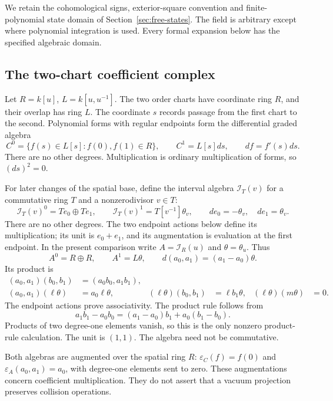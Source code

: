 We retain the cohomological signs, exterior-square convention and
finite-polynomial state domain of Section~\ref{sec:free-states}.
The field is arbitrary except where polynomial integration is used.
Every formal expansion below has the specified algebraic domain.

\subsection{The two-chart coefficient complex}
\label{sb:sec:two-chart}

Let \(R=k[u]\), \(L=k[u,u^{-1}]\).  The two order charts have
coordinate ring \(R\), and their overlap has ring \(L\).
The coordinate \(s\) records passage from the first chart to the second.
Polynomial forms with regular endpoints form the differential graded algebra
\[
 C^0=\{f(s)\in L[s]:f(0),f(1)\in R\},\qquad
 C^1=L[s]ds,\qquad df=f'(s)ds.
\]
There are no other degrees.  Multiplication is ordinary multiplication
of forms, so \((ds)^2=0\).

For later changes of the spatial base, define the interval algebra
\(\mathcal I_T(v)\) for a commutative ring \(T\) and a
nonzerodivisor \(v\in T\):
\begin{equation}\label{sb:eq:general-interval}
 \mathcal I_T(v)^0=Te_0\oplus Te_1,\qquad
 \mathcal I_T(v)^1=T[v^{-1}]\theta_v,\qquad
 de_0=-\theta_v,\quad de_1=\theta_v.
\end{equation}
There are no other degrees.  The two endpoint actions below define
its multiplication; its unit is \(e_0+e_1\), and its augmentation
is evaluation at the first endpoint.  In the present comparison write
\(A=\mathcal I_R(u)\) and \(\theta=\theta_u\).  Thus
\begin{equation}\label{sb:eq:two-chart}
 A^0=R\oplus R,\qquad A^1=L\theta,\qquad
 d(a_0,a_1)=(a_1-a_0)\theta.
\end{equation}
Its product is
\[
 \begin{aligned}
 (a_0,a_1)(b_0,b_1)&=(a_0b_0,a_1b_1),\\
 (a_0,a_1)(\ell\theta)&=a_0\ell\theta,&
 (\ell\theta)(b_0,b_1)&=\ell b_1\theta,&
 (\ell\theta)(m\theta)&=0.
 \end{aligned}
\]
The endpoint actions prove associativity.  The product rule follows from
\[
 a_1b_1-a_0b_0=(a_1-a_0)b_1+a_0(b_1-b_0).
\]
Products of two degree-one elements vanish, so this is the only
nonzero product-rule calculation.  The unit is \((1,1)\).
The algebra need not be commutative.

Both algebras are augmented over the spatial ring \(R\):
\(\varepsilon_C(f)=f(0)\) and
\(\varepsilon_A(a_0,a_1)=a_0\), with degree-one elements
sent to zero.  These augmentations concern coefficient multiplication.
They do not assert that a vacuum projection preserves collision operations.

